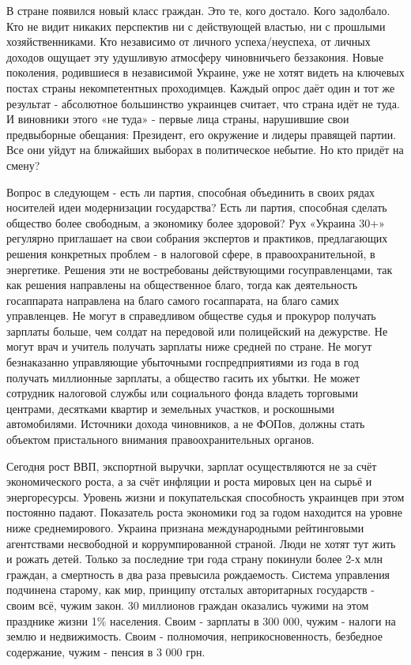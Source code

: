 В стране появился новый класс граждан. Это те, кого достало. Кого задолбало.
Кто не видит никаких перспектив ни с действующей властью, ни с прошлыми
хозяйственниками. Кто независимо от личного успеха/неуспеха, от личных доходов
ощущает эту удушливую атмосферу чиновничьего беззакония. Новые поколения,
родившиеся в независимой Украине, уже не хотят видеть на ключевых постах страны
некомпетентных проходимцев. Каждый опрос даёт один и тот же результат -
абсолютное большинство украинцев считает, что страна идёт не туда. И виновники
этого «не туда» - первые лица страны, нарушившие свои предвыборные обещания:
Президент, его окружение и лидеры правящей партии. Все они уйдут на ближайших
выборах в политическое небытие. Но кто придёт на смену?

Вопрос в следующем - есть ли партия, способная объединить в своих рядах
носителей идеи модернизации государства? Есть ли партия, способная сделать
общество более свободным, а экономику более здоровой? Рух «Украина 30+»
регулярно приглашает на свои собрания экспертов и практиков, предлагающих
решения конкретных проблем - в налоговой сфере, в правоохранительной, в
энергетике. Решения эти не востребованы действующими госуправленцами, так как
решения направлены на общественное благо, тогда как деятельность госаппарата
направлена на благо самого госаппарата, на благо самих управленцев. Не могут
в справедливом обществе судья и прокурор получать зарплаты больше, чем солдат
на передовой или полицейский на дежурстве. Не могут врач и учитель получать
зарплаты ниже средней по стране. Не могут безнаказанно управляющие убыточными
госпредприятиями из года в год получать миллионные зарплаты, а общество гасить
их убытки. Не может сотрудник налоговой службы или социального фонда владеть
торговыми центрами, десятками квартир и земельных участков, и роскошными
автомобилями. Источники дохода чиновников, а не ФОПов, должны стать объектом
пристального внимания правоохранительных органов.

Сегодня рост ВВП, экспортной выручки, зарплат осуществляются не за счёт
экономического роста, а за счёт инфляции и роста мировых цен на сырьё и
энергоресурсы. Уровень жизни и покупательская способность украинцев при этом
постоянно падают. Показатель роста экономики год за годом находится на уровне
ниже среднемирового. Украина признана международными рейтинговыми агентствами
несвободной и коррумпированной страной. Люди не хотят тут жить и рожать детей.
Только за последние три года страну покинули более 2-х млн граждан, а
смертность в два раза превысила рождаемость. Система управления подчинена
старому, как мир, принципу отсталых авторитарных государств - своим всё, чужим
закон. 30 миллионов граждан оказались чужими на этом празднике жизни 1\%
населения. Своим - зарплаты в 300 000, чужим - налоги на землю и недвижимость.
Своим - полномочия, неприкосновенность, безбедное содержание, чужим - пенсия в
3 000 грн.

